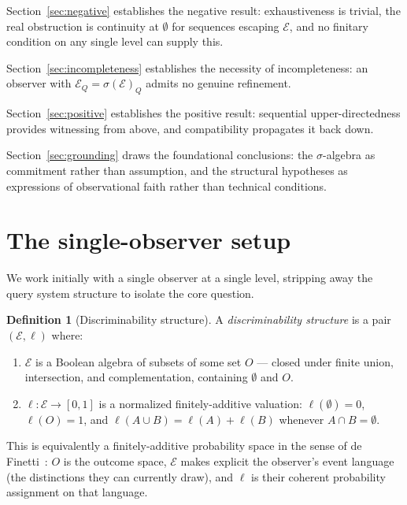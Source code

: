 \documentclass[12pt]{article}
\theoremstyle{definition}
\newtheorem{definition}[theorem]{Definition}
\theoremstyle{remark}
\newcommand{\E}{\mathcal{E}}
\newcommand{\sigE}{\sigma(\mathcal{E})}
\begin{document}
Section~\ref{sec:negative} establishes the negative result: exhaustiveness is trivial,
the real obstruction is continuity at $\emptyset$ for sequences escaping $\E$, and no
finitary condition on any single level can supply this.

Section~\ref{sec:incompleteness} establishes the necessity of incompleteness: an
observer with $\E_Q = \sigE_Q$ admits no genuine refinement.

Section~\ref{sec:positive} establishes the positive result: sequential upper-directedness
provides witnessing from above, and compatibility propagates it back down.

Section~\ref{sec:grounding} draws the foundational conclusions: the $\sigma$-algebra as
commitment rather than assumption, and the structural hypotheses as expressions of
observational faith rather than technical conditions.

\section{The single-observer setup}
\label{sec:setup}

We work initially with a single observer at a single level, stripping away the query
system structure to isolate the core question.

\begin{definition}[Discriminability structure]
A \emph{discriminability structure} is a pair $(\E, \ell)$ where:
\begin{enumerate}[label=(\roman*)]
  \item $\E$ is a Boolean algebra of subsets of some set $O$ --- closed under finite
    union, intersection, and complementation, containing $\emptyset$ and $O$.
  \item $\ell : \E \to [0,1]$ is a normalized finitely-additive valuation:
    $\ell(\emptyset) = 0$, $\ell(O) = 1$, and $\ell(A \cup B) = \ell(A) + \ell(B)$
    whenever $A \cap B = \emptyset$.
\end{enumerate}
This is equivalently a finitely-additive probability space in the sense of de
Finetti~\cite{deFinetti1974}: $O$ is the outcome space, $\E$ makes explicit the
observer's event language (the distinctions they can currently draw), and $\ell$
is their coherent probability assignment on that language.
\end{definition}
\end{document}
